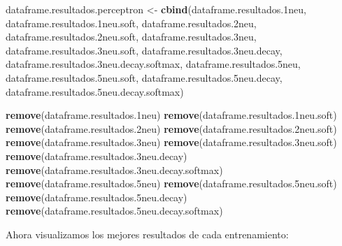 \documentclass[]{article}
\newenvironment{Shaded}{\begin{snugshade}}{\end{snugshade}}
\newcommand{\KeywordTok}[1]{\textcolor[rgb]{0.13,0.29,0.53}{\textbf{#1}}}
\newcommand{\StringTok}[1]{\textcolor[rgb]{0.31,0.60,0.02}{#1}}
\newcommand{\NormalTok}[1]{#1}
\begin{document}
\begin{Shaded}
\begin{Highlighting}[]
\NormalTok{dataframe.resultados.perceptron <-}\StringTok{ }\KeywordTok{cbind}\NormalTok{(dataframe.resultados.1neu,}
\NormalTok{                                         dataframe.resultados.1neu.soft,}
\NormalTok{                                         dataframe.resultados.2neu,}
\NormalTok{                                         dataframe.resultados.2neu.soft,}
\NormalTok{                                         dataframe.resultados.3neu,}
\NormalTok{                                         dataframe.resultados.3neu.soft,}
\NormalTok{                                         dataframe.resultados.3neu.decay,}
\NormalTok{                                         dataframe.resultados.3neu.decay.softmax,}
\NormalTok{                                         dataframe.resultados.5neu,}
\NormalTok{                                         dataframe.resultados.5neu.soft,}
\NormalTok{                                         dataframe.resultados.5neu.decay,}
\NormalTok{                                         dataframe.resultados.5neu.decay.softmax)}

\KeywordTok{remove}\NormalTok{(dataframe.resultados.1neu)}
\KeywordTok{remove}\NormalTok{(dataframe.resultados.1neu.soft)}
\KeywordTok{remove}\NormalTok{(dataframe.resultados.2neu)}
\KeywordTok{remove}\NormalTok{(dataframe.resultados.2neu.soft)}
\KeywordTok{remove}\NormalTok{(dataframe.resultados.3neu)}
\KeywordTok{remove}\NormalTok{(dataframe.resultados.3neu.soft)}
\KeywordTok{remove}\NormalTok{(dataframe.resultados.3neu.decay)}
\KeywordTok{remove}\NormalTok{(dataframe.resultados.3neu.decay.softmax)}
\KeywordTok{remove}\NormalTok{(dataframe.resultados.5neu)}
\KeywordTok{remove}\NormalTok{(dataframe.resultados.5neu.soft)}
\KeywordTok{remove}\NormalTok{(dataframe.resultados.5neu.decay)}
\KeywordTok{remove}\NormalTok{(dataframe.resultados.5neu.decay.softmax)}
\end{Highlighting}
\end{Shaded}

Ahora visualizamos los mejores resultados de cada entrenamiento:
\end{document}
